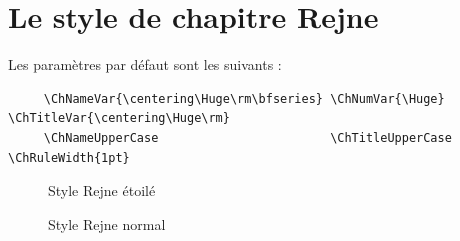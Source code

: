 \documentclass{report}
\begin{document}
    \section{Le style de chapitre Rejne}
    Les paramètres par défaut sont les suivants :
    {\small\begin{verbatim}  
     \ChNameVar{\centering\Huge\rm\bfseries} \ChNumVar{\Huge}  \ChTitleVar{\centering\Huge\rm}
     \ChNameUpperCase                        \ChTitleUpperCase \ChRuleWidth{1pt}
    \end{verbatim}}
    \begin{figure}[h]
      \begin{minipage}{7 cm}
        \centerline{\color{gray!25}}
        \caption{Style Rejne \og étoilé \fg{}}
      \end{minipage}\hfill
      \begin{minipage}{7 cm}
        \centerline{\color{gray!25}}
        \caption{Style Rejne \og normal \fg{}}
      \end{minipage}\hfill
    \end{figure}
\end{document}
